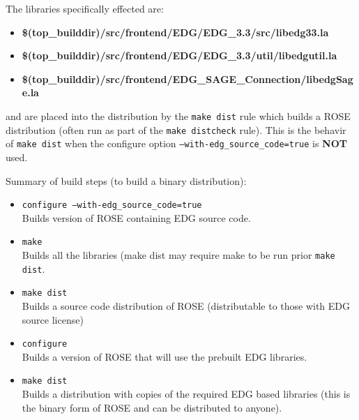 The libraries specifically effected are:
\begin{itemize}
   \item {\bf \$(top_builddir)/src/frontend/EDG/EDG_3.3/src/libedg33.la}
   \item {\bf \$(top_builddir)/src/frontend/EDG/EDG_3.3/util/libedgutil.la}
   \item {\bf \$(top_builddir)/src/frontend/EDG_SAGE_Connection/libedgSage.la}
\end{itemize}
and are placed into the distribution by the {\tt make dist} rule which builds a ROSE distribution
(often run as part of the {\tt make distcheck} rule).  This is the behavir of {\tt make dist}
when the configure option {\tt --with-edg_source_code=true} is {\bf NOT} used.

Summary of build steps (to build a binary distribution):
\begin{itemize}
   \item {\tt configure --with-edg_source_code=true} \\
          Builds version of ROSE containing EDG source code.
   \item  {\tt make} \\
          Builds all the libraries (make dist may require make to be run prior {\tt make dist}.
   \item  {\tt make dist} \\
          Builds a source code distribution of ROSE (distributable to those with EDG source license)
   \item {\tt configure} \\
          Builds a version of ROSE that will use the prebuilt EDG libraries.
   \item {\tt make dist} \\
          Builds a distribution with copies of the required EDG based libraries
          (this is the binary form of ROSE and can be distributed to anyone).
\end{itemize}


